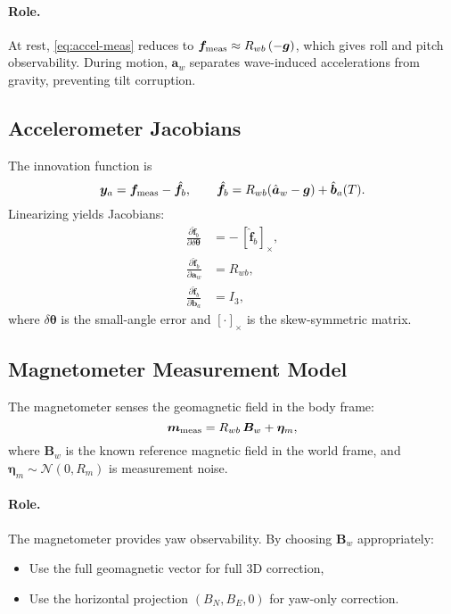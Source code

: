 \documentclass[10pt]{extarticle}
\begin{document}
\paragraph{Role.}
At rest, \eqref{eq:accel-meas} reduces to $\bm f_{\rm meas} \approx R_{wb}\,(-\bm g)$,
which gives roll and pitch observability. During motion, $\bm a_w$ separates wave-induced
accelerations from gravity, preventing tilt corruption.

\subsection{Accelerometer Jacobians}
The innovation function is
\[
\bm y_a = \bm f_{\rm meas} - \hat{\bm f}_b,
\qquad
\hat{\bm f}_b = R_{wb}(\hat{\bm a}_w - \bm g) + \hat{\bm b}_a(T).
\]
Linearizing yields Jacobians:
\begin{align}
\frac{\partial \hat{\bm f}_b}{\partial \delta\bm\theta} &= -\,[\hat{\bm f}_b]_\times,
\label{eq:accel-jac-att}\\
\frac{\partial \hat{\bm f}_b}{\partial \bm a_w} &= R_{wb},
\label{eq:accel-jac-aw}\\
\frac{\partial \hat{\bm f}_b}{\partial \bm b_a} &= I_3,
\label{eq:accel-jac-bias}
\end{align}
where $\delta\bm\theta$ is the small-angle error and $[\cdot]_\times$ is the skew-symmetric matrix.

\subsection{Magnetometer Measurement Model}
The magnetometer senses the geomagnetic field in the body frame:
\begin{equation}
\bm m_{\rm meas} = R_{wb}\,\bm B_w + \bm\eta_m,
\label{eq:mag-meas}
\end{equation}
where $\bm B_w$ is the known reference magnetic field in the world frame,
and $\bm\eta_m \sim \mathcal{N}(0,R_m)$ is measurement noise.

\paragraph{Role.}
The magnetometer provides yaw observability. By choosing $\bm B_w$ appropriately:
\begin{itemize}
\item Use the full geomagnetic vector for full 3D correction,
\item Use the horizontal projection $(B_N,B_E,0)$ for yaw-only correction.
\end{itemize}
\end{document}
